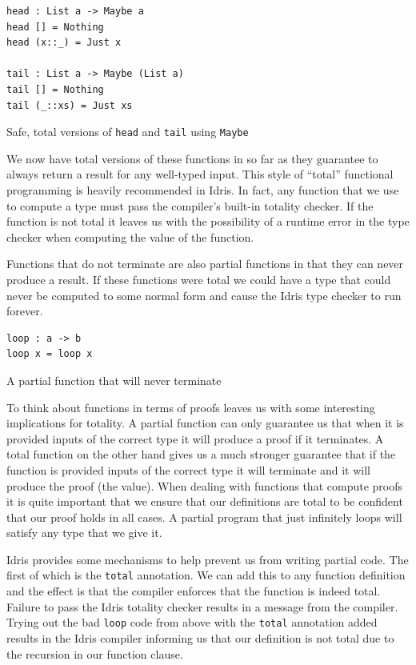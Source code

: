 \documentclass[a4paper, notitlepage]{report}
\begin{document}
\begin{listing}[H]
\begin{verbatim}
head : List a -> Maybe a
head [] = Nothing
head (x::_) = Just x

tail : List a -> Maybe (List a)
tail [] = Nothing
tail (_::xs) = Just xs
\end{verbatim}
\caption{Safe, total versions of \texttt{head} and \texttt{tail} using \texttt{Maybe}}
\end{listing}

We now have total versions of these functions in so far as they guarantee to
always return a result for any well-typed input. This style of ``total''
functional programming is heavily recommended in Idris. In fact, any function
that we use to compute a type must pass the compiler's built-in totality
checker. If the function is not total it leaves us with the possibility of a
runtime error in the type checker when computing the value of the function.

Functions that do not terminate are also partial functions in that they can
never produce a result. If these functions were total we could have a type that
could never be computed to some normal form and cause the Idris type checker to
run forever.

\begin{listing}[H]
\begin{verbatim}
loop : a -> b
loop x = loop x
\end{verbatim}
\caption{A partial function that will never terminate}
\end{listing}

To think about functions in terms of proofs leaves us with some interesting
implications for totality. A partial function can only guarantee us that when it
is provided inputs of the correct type it will produce a proof if it terminates.
A total function on the other hand gives us a much stronger guarantee that if
the function is provided inputs of the correct type it will terminate and it
will produce the proof (the value). When dealing with functions that compute
proofs it is quite important that we ensure that our definitions are total to be
confident that our proof holds in all cases. A partial program that just
infinitely loops will satisfy any type that we give it.

Idris provides some mechanisms to help prevent us from writing partial code. The
first of which is the \texttt{total} annotation. We can add this to any function
definition and the effect is that the compiler enforces that the function is
indeed total. Failure to pass the Idris totality checker results in a message
from the compiler. Trying out the bad \texttt{loop} code from above with the \texttt{total}
annotation added results in the Idris compiler informing us that our definition
is not total due to the recursion in our function clause.
\end{document}
